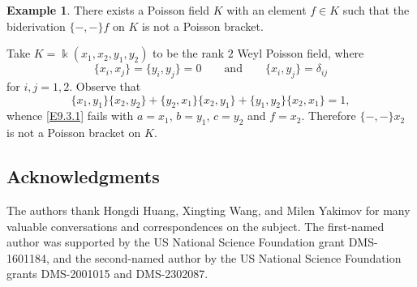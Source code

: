 \documentclass[12pt]{amsart}
\theoremstyle{plain}
\numberwithin{theorem}{section}
\numberwithin{equation}{theorem}
\theoremstyle{definition}
\newtheorem{example}[theorem]{Example}
\begin{document}
\begin{example}  \label{zzexa9.5}
There exists a Poisson field $K$ with an element $f \in K$ such that the biderivation $\{-,-\} f$ on $K$ is not a Poisson bracket.

Take $K = \Bbbk(x_1,x_2,y_1,y_2)$ to be the rank $2$ Weyl Poisson field, where
$$
\{x_i,x_j\} = \{y_i,y_j\} = 0 \qquad\text{and}\qquad \{x_i,y_j\} = \delta_{ij}
$$
for $i,j=1,2$. Observe that
$$
\{x_1,y_1\} \{x_2,y_2\} + \{y_2,x_1\} \{x_2,y_1\} + \{y_1,y_2\} \{x_2,x_1\} = 1,
$$
whence \eqref{E9.3.1} fails with $a=x_1$, $b=y_1$, $c=y_2$ and $f=x_2$. Therefore $\{-,-\} x_2$ is not a Poisson bracket on $K$.
\end{example}




\subsection*{Acknowledgments} 
The authors thank Hongdi Huang, Xingting Wang, and Milen Yakimov for many valuable conversations and correspondences on the subject. 
The first-named author was supported by the US National Science Foundation 
grant DMS-1601184, and the second-named author by the US National Science Foundation 
grants DMS-2001015 and DMS-2302087.




\providecommand{\bysame}{\leavevmode\hbox to3em{\hrulefill}\thinspace}
\providecommand{\MR}{\relax\ifhmode\unskip\space\fi MR }
\providecommand{\MRhref}[2]{%

\href{http://www.ams.org/mathscinet-getitem?mr=#1}{#2} }
\providecommand{\href}[2]{#2}
\end{document}
